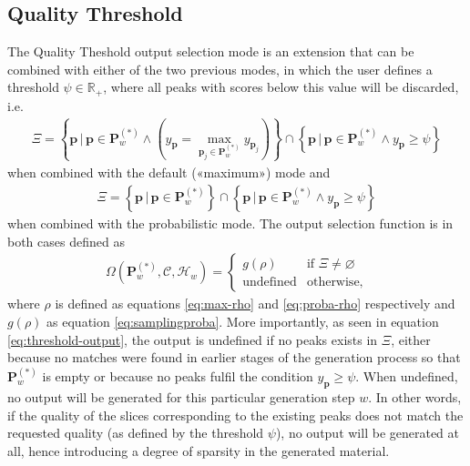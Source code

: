 \subsection{Quality Threshold}\label{ssec:qual-thresh}
The Quality Theshold output selection mode is an extension that can be combined with either of the two previous modes, in which the user defines a threshold $\psi \in \mathbb R_+$, where all peaks with scores below this value will be discarded, i.e.
	\begin{align}
		\Xi = \left\lbrace \bm p \,\bigg\vert	\, \bm p \in \bm P^{(\ast)}_w \wedge \left( y_{\bm p} = \max_{\bm p_j \in \bm P^{(\ast)}_w} y_{\bm p_j}\right)\right\rbrace
		\cap \left\lbrace \bm p \, \bigg\vert \, \bm p \in \bm P^{(\ast)}_w \wedge y_{\bm p} \ge \psi\right\rbrace
	\end{align}
	when combined with the default («maximum») mode and 
	\begin{align}
		\Xi = \left\lbrace \bm p \, \bigg\vert \, \bm p \in \bm P^{(\ast)}_w\right\rbrace 
		\cap \left\lbrace \bm p \, \bigg\vert \, \bm p \in \bm P^{(\ast)}_w \wedge y_{\bm p} \ge \psi\right\rbrace
	\end{align}
	when combined with the probabilistic mode. The output selection function is in both cases defined as
	\begin{align}\label{eq:threshold-output}
		\Omega\left(\bm P^{(\ast)}_w, \mathcal C, \mathcal H_w\right) = \left\lbrace\begin{array}{ll}
				g(\rho) & \text{if } \Xi \ne \varnothing\\
				\text{undefined} & \text{otherwise},
			\end{array}\right.
	\end{align}
	where $\rho$ is defined as equations \ref{eq:max-rho} and \ref{eq:proba-rho} respectively and $g(\rho)$ as equation \ref{eq:samplingproba}. More importantly, as seen in equation \ref{eq:threshold-output}, the output is undefined if no peaks exists in $\Xi$, either because no matches were found in earlier stages of the generation process so that $\bm P^{(\ast)}_w$ is empty or because no peaks fulfil the condition $y_{\bm p} \ge \psi$. When undefined, no output will be generated for this particular generation step $w$. In other words, if the quality of the slices corresponding to the existing peaks does not match the requested quality (as defined by the threshold $\psi$), no output will be generated at all, hence introducing a degree of sparsity in the generated material.




